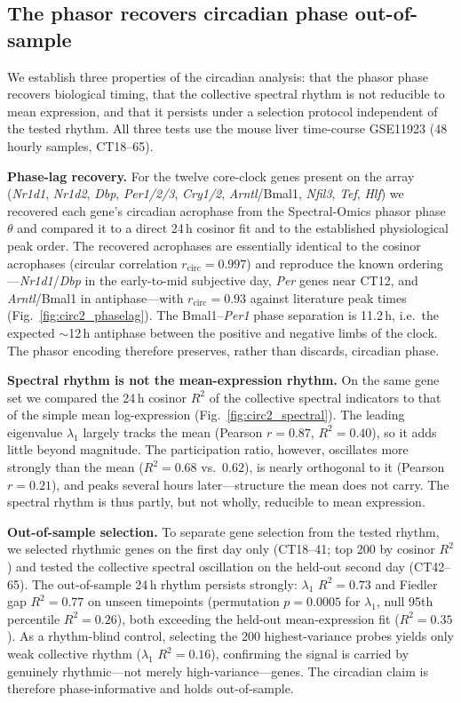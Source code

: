 \subsection{The phasor recovers circadian phase out-of-sample}
\label{sec:res-circadian}

We establish three properties of the circadian analysis: that the phasor phase
recovers biological timing, that the collective spectral rhythm is not reducible
to mean expression, and that it persists under a selection protocol independent of
the tested rhythm. All three tests use the mouse liver time-course
GSE11923 \citep{hughes2009harmonics} (48 hourly samples, CT18--65).

\textbf{Phase-lag recovery.} For the twelve core-clock genes present on the array
(\textit{Nr1d1}, \textit{Nr1d2}, \textit{Dbp}, \textit{Per1/2/3}, \textit{Cry1/2},
\textit{Arntl}/Bmal1, \textit{Nfil3}, \textit{Tef}, \textit{Hlf}) we recovered each
gene's circadian acrophase from the Spectral-Omics phasor phase $\theta$ and compared
it to a direct 24\,h cosinor fit and to the established physiological peak order. The
recovered acrophases are essentially identical to the cosinor acrophases
(circular correlation $r_{\mathrm{circ}}=0.997$) and reproduce the known
ordering---\textit{Nr1d1}/\textit{Dbp} in the early-to-mid subjective day,
\textit{Per} genes near CT12, and \textit{Arntl}/Bmal1 in antiphase---with
$r_{\mathrm{circ}}=0.93$ against literature peak times
(Fig.~\ref{fig:circ2_phaselag}). The Bmal1--\textit{Per1} phase separation is
11.2\,h, i.e.\ the expected $\sim$12\,h antiphase between the positive and
negative limbs of the clock. The phasor encoding therefore preserves, rather than
discards, circadian phase.

\textbf{Spectral rhythm is not the mean-expression rhythm.} On the same gene set we
compared the 24\,h cosinor $R^2$ of the collective spectral indicators to that of the
simple mean log-expression (Fig.~\ref{fig:circ2_spectral}). The leading eigenvalue
$\lambda_1$ largely tracks the mean (Pearson $r=0.87$, $R^2=0.40$), so it
adds little beyond magnitude. The participation ratio, however, oscillates more
strongly than the mean ($R^2=0.68$ vs.\ $0.62$), is nearly orthogonal to
it (Pearson $r=0.21$), and peaks several hours later---structure the mean does
not carry. The spectral rhythm is thus partly, but not wholly, reducible to mean
expression.

\textbf{Out-of-sample selection.} To separate gene selection from the tested
rhythm, we
selected rhythmic genes on the first day only (CT18--41; top 200 by cosinor $R^2$) and
tested the collective spectral oscillation on the held-out second day (CT42--65). The
out-of-sample 24\,h rhythm persists strongly: $\lambda_1$ $R^2=0.73$ and Fiedler
gap $R^2=0.77$ on unseen timepoints (permutation $p=0.0005$ for $\lambda_1$,
null 95th percentile $R^2=0.26$), both exceeding the held-out mean-expression fit
($R^2=0.35$). As a rhythm-blind control, selecting the 200 highest-variance
probes yields only weak collective rhythm ($\lambda_1$ $R^2=0.16$), confirming the
signal is carried by genuinely rhythmic---not merely high-variance---genes. The
circadian claim is therefore phase-informative and holds out-of-sample.
